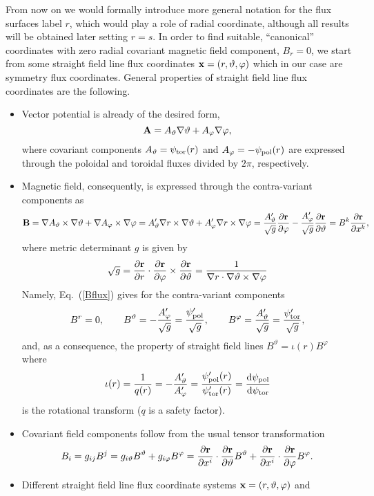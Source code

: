 \documentclass[12pt]{article}
\newcommand{\be}[1]{\begin{equation} \label{#1}}
\newcommand{\ee}{\end{equation}}
\newcommand{\eq}[1]{(\ref{#1})}
\newcommand{\difp}[2]{\frac{\partial #1}{\partial #2}}
\newcommand{\br}{{\bf r}}
\newcommand{\bA}{{\bf A}}
\newcommand{\bB}{{\bf B}}
\newcommand{\bx}{{\bf x}}
\newcommand{\rd}{{\rm d}}
\begin{document}
\noindent
From now on we would formally introduce more general notation for the flux surfaces label $r$, which would 
play a role of radial coordinate, although all results will be obtained later setting $r=s$.
In order to find suitable, ``canonical'' coordinates with zero radial covariant magnetic field component, 
$B_r=0$, we start from some straight field line flux coordinates $\bx=(r,\vartheta,\varphi)$ which in our case
are symmetry flux coordinates. 
General properties of straight field line flux coordinates are the following.
\begin{itemize}
\item 
Vector potential is already of the desired form,
\be{Aflux}
\bA = A_\vartheta\nabla\vartheta+A_\varphi\nabla\varphi,
\ee
where covariant components $A_\vartheta=\psi_{\rm tor}(r)$ and 
$A_\varphi=-\psi_{\rm pol}(r)$ are expressed through the
poloidal and toroidal fluxes divided by $2\pi$, respectively.
\item
Magnetic field, consequently, is expressed through the contra-variant components
as
\be{Bflux}
\bB = 
\nabla A_\vartheta\times\nabla\vartheta
+\nabla A_\varphi\times\nabla\varphi
=
 A_\vartheta^\prime \nabla r\times\nabla\vartheta
+A_\varphi^\prime \nabla r\times\nabla\varphi
=
\frac{A_\vartheta^\prime}{\sqrt{g}}\difp{\br}{\varphi}
-\frac{A_\varphi^\prime}{\sqrt{g}}\difp{\br}{\vartheta}
=
B^k \difp{\br}{x^k},
\ee
where metric determinant $g$ is given by
\be{sqrtg}
\sqrt{g}=\difp{\br}{r}\cdot\difp{\br}{\varphi}\times\difp{\br}{\vartheta}
=\frac{1}{\nabla r \cdot \nabla\vartheta\times\nabla\varphi}
\ee
Namely, Eq.~\eq{Bflux} gives for the contra-variant components
\be{conraBcomp}
B^r=0,  
\qquad B^\vartheta 
= -\frac{A_\varphi^\prime}{\sqrt{g}}
=\frac{\psi_{\rm pol}^\prime}{\sqrt{g}},
\qquad B^\varphi 
= \frac{A_\vartheta^\prime}{\sqrt{g}}
= \frac{\psi_{\rm tor}^\prime}{\sqrt{g}},
\ee
and, as a consequence, 
the property of straight field lines $B^\vartheta=\iota(r) B^\varphi$
where
\be{iotadef}
\iota(r)=\frac{1}{q(r)}=-\frac{A_\vartheta^\prime}{A_\varphi^\prime}
=\frac{\psi_{\rm pol}^\prime(r)}
{\psi_{\rm tor}^\prime(r)}=
\frac{\rd \psi_{\rm pol}}{\rd \psi_{\rm tor}}
\ee
is the rotational transform ($q$ is a safety factor).
\item
Covariant field components follow from the usual tensor transformation
\be{bcovar}
B_i = g_{ij}B^j=g_{i\vartheta}B^\vartheta+g_{i\varphi}B^\varphi
=\difp{\br}{x^i}\cdot\difp{\br}{\vartheta}B^\vartheta+\difp{\br}{x^i}\cdot\difp{\br}{\varphi}B^\varphi.
\ee
\item
Different straight field line flux coordinate systems $\bx=(r,\vartheta,\varphi)$ and 

\end{itemize}
\end{document}

